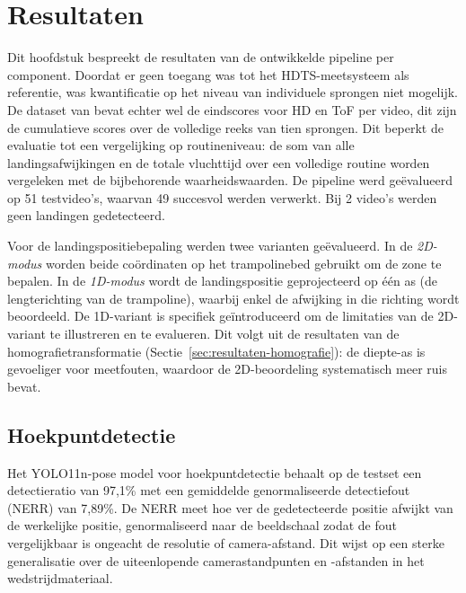 
\chapter{Resultaten}
\label{ch:resultaten}

Dit hoofdstuk bespreekt de resultaten van de ontwikkelde pipeline per component. Doordat er geen toegang was tot het HDTS-meetsysteem als referentie, was kwantificatie op het niveau van individuele sprongen niet mogelijk. De dataset van \textcite{Lin2025} bevat echter wel de eindscores voor HD en ToF per video, dit zijn de cumulatieve scores over de volledige reeks van tien sprongen. Dit beperkt de evaluatie tot een vergelijking op routineniveau: de som van alle landingsafwijkingen en de totale vluchttijd over een volledige routine worden vergeleken met de bijbehorende waarheidswaarden. De pipeline werd geëvalueerd op 51 testvideo's, waarvan 49 succesvol werden verwerkt. Bij 2 video's werden geen landingen gedetecteerd.

Voor de landingspositiebepaling werden twee varianten geëvalueerd. In de \emph{2D-modus} worden beide coördinaten op het trampolinebed gebruikt om de zone te bepalen. In de \emph{1D-modus} wordt de landingspositie geprojecteerd op één as (de lengterichting van de trampoline), waarbij enkel de afwijking in die richting wordt beoordeeld. De 1D-variant is specifiek geïntroduceerd om de limitaties van de 2D-variant te illustreren en te evalueren. Dit volgt uit de resultaten van de homografietransformatie (Sectie~\ref{sec:resultaten-homografie}): de diepte-as is gevoeliger voor meetfouten, waardoor de 2D-beoordeling systematisch meer ruis bevat.


\section{Hoekpuntdetectie}
\label{sec:resultaten-hoekpunten}

Het YOLO11n-pose model voor hoekpuntdetectie behaalt op de testset een detectieratio van 97,1\% met een gemiddelde genormaliseerde detectiefout (NERR) van 7,89\%. De NERR meet hoe ver de gedetecteerde positie afwijkt van de werkelijke positie, genormaliseerd naar de beeldschaal zodat de fout vergelijkbaar is ongeacht de resolutie of camera-afstand. Dit wijst op een sterke generalisatie over de uiteenlopende camerastandpunten en -afstanden in het wedstrijdmateriaal.

